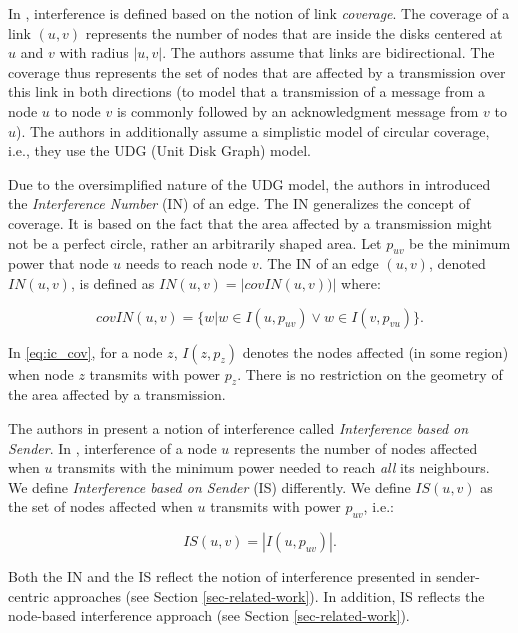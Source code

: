 \documentclass{llncs}
\begin{document}
In \cite{burkhart2004}, interference is defined based on the notion of link \textit{coverage}.
The coverage of a link $(u, v)$ represents the number of nodes that are inside the disks centered at $u$ and $v$ with radius $|u,v|$. The authors assume that links are bidirectional.
The coverage thus represents the set of nodes that are affected by a transmission over this link in both directions (to model that a transmission of a message from a node
$u$ to node $v$ is commonly followed by an acknowledgment message from $v$ to $u$). 
The authors in \cite{burkhart2004} additionally assume a simplistic model of circular coverage, i.e., they use the
UDG (Unit Disk Graph) model. 


Due to the oversimplified nature of the UDG model, the authors in \cite{blough2005} introduced the \textit{Interference Number} (IN) of
an edge. The IN generalizes the concept of coverage. It is based on the fact that the area affected by a transmission might not be a perfect circle, rather an arbitrarily shaped area.
Let $p_{uv}$ be the minimum power that node $u$ needs to reach node $v$. 
The IN of an edge $(u,v)$, denoted $IN(u,v)$, is defined as $IN(u, v) = |covIN(u,v))|$ where:

\begin{equation}
\label{eq:ic_cov}
  covIN(u,v) = \lbrace w | w \in I(u,p_{uv}) \lor w \in I(v,p_{vu})\rbrace.
\end{equation}

In \eqref{eq:ic_cov}, for a node $z$, $I(z,p_{z})$ denotes the nodes affected (in some region) when node $z$ transmits with power $p_{z}$. There is no restriction on the geometry of the area
affected by a transmission.

The authors in \cite{Li05} present a notion of interference called \textit{Interference based on Sender}.
In \cite{Li05}, interference of a node $u$ represents the number of nodes affected when $u$ transmits with the minimum power needed to reach \emph{all}
its neighbours. 
We define \emph{Interference based on Sender} (IS) differently.  
We define $IS(u, v)$ as the set of nodes affected when $u$ transmits with power $p_{uv}$, i.e.: 

\begin{equation}
\label{eq:is_cov}
  IS(u, v)=|I(u, p_{uv})|. 
\end{equation}


Both the IN and the IS reflect the notion of interference presented in sender-centric approaches (see Section \ref{sec-related-work}).
In addition, IS reflects the node-based interference approach (see Section \ref{sec-related-work}).
\end{document}
